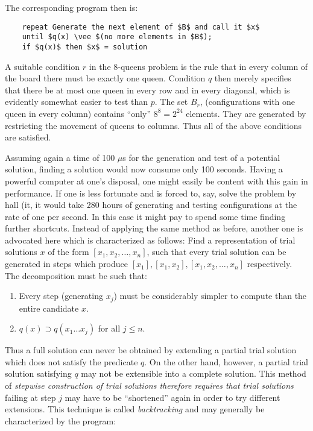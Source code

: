 The corresponding program then is:

\begin{lstlisting}
    repeat Generate the next element of $B$ and call it $x$
    until $q(x) \vee $(no more elements in $B$);
    if $q(x)$ then $x$ = solution
\end{lstlisting}

A suitable condition $r$ in the 8-queens problem is the rule that in every
column of the board there must be exactly one queen.  Condition $q$ then merely
specifies that there be at most one queen in every row and in every diagonal,
which is evidently somewhat easier to test than $p$.  The set $B_r$,
(configurations with one queen in every column) contains ``only'' $8^8 =
2^{24}$ elements.  They are generated by restricting the movement of queens to
columns.  Thus all of the above conditions are satisfied.

Assuming again a time of 100 $\mu$s for the generation and test of a potential
solution, finding a solution would now consume only 100 seconds.  Having a
powerful computer at one's disposal, one might easily be content with this gain
in performance.  If one is less fortunate and is forced to, say, solve the
problem by hall (it, it would take 280 hours of generating and testing
configurations at the rate of one per second.  In this case it might pay to
spend some time finding further shortcuts.  Instead of applying the same method
as before, another one is advocated here which is characterized as follows:
Find a representation of trial solutions $x$ of the form $[x_1, x_2, \ldots
,x_n]$, such that every trial solution can be generated in steps which produce
$[x_1], [x_1, x_2], [x_1, x_2, \ldots , x_n]$ respectively.  The decomposition
must be such that:

\begin{enumerate}
    \item Every step (generating $x_j$) must be considerably simpler to compute
          than the entire candidate $x$.
    \item $q(x) \supset q(x_1 \ldots x_j)$ for all $j \leq n$.
\end{enumerate}

Thus a full solution can never be obtained by extending a partial trial
solution which does not satisfy the predicate $q$.  On the other hand, however,
a partial trial solution satisfying $q$ may not be extensible into a complete
solution.  This method of \emph{stepwise construction of trial solutions
therefore requires that trial solutions} failing at step $j$ may have to be
``shortened'' again in order to try different extensions.  This technique is
called \emph{backtracking} and may generally be characterized by the program:

